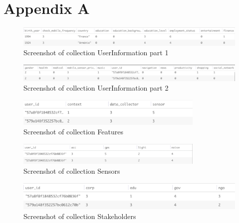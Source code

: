 \chapter{Appendix A}

\begin{figure}[ht!]
\centering
\includegraphics[width=\textwidth,keepaspectratio]{./images/collection_ui_1}
\caption{Screenshot of collection UserInformation part 1}
\label{fig:col_ui_1}
\end{figure}

\begin{figure}[ht!]
\centering
\includegraphics[width=\textwidth,keepaspectratio]{./images/collection_ui_2}
\caption{Screenshot of collection UserInformation part 2}
\label{fig:col_ui_2}
\end{figure}

\begin{figure}[ht!]
\centering
\includegraphics[width=0.8\textwidth,keepaspectratio]{./images/collection_feature_cat}
\caption{Screenshot of collection Features}
\label{fig:col_f}
\end{figure}

\begin{figure}[ht!]
\centering
\includegraphics[width=0.8\textwidth,keepaspectratio]{./images/collection_sensors_cat}
\caption{Screenshot of collection Sensors}
\label{fig:col_s}
\end{figure}

\begin{figure}[ht!]
\centering
\includegraphics[width=\textwidth,keepaspectratio]{./images/collection_dc_cat}
\caption{Screenshot of collection Stakeholders}
\label{fig:col_ss}
\end{figure}

